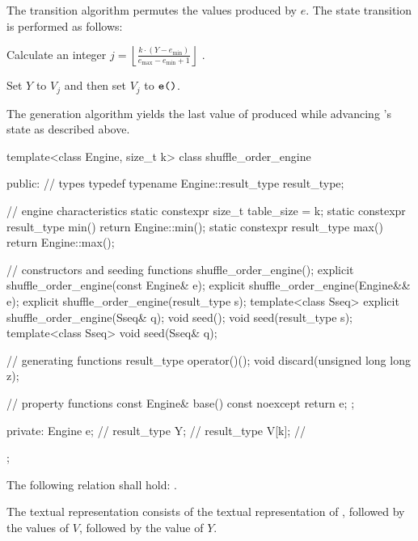 \pnum
The transition algorithm%
%
permutes the values produced by $e$.
The state transition is performed as follows:
\begin{enumeratea}
 \item
   Calculate an integer
   $j = \left\lfloor \frac{k \cdot (Y - e_{\min})}
                          {e_{\max} - e_{\min} +1}
        \right\rfloor
   $%
   .
 \item
   Set $Y$ to $V_j$ and then set $V_j$ to $\texttt{e()}$.
\end{enumeratea}

\pnum
The generation algorithm%
%
yields the last value of 
 produced while advancing 's state as described above.

\begin{codeblock}
template<class Engine, size_t k>
 class shuffle_order_engine
{
public:
 // types
 typedef typename Engine::result_type result_type;

 // engine characteristics
 static constexpr size_t table_size = k;
 static constexpr result_type min() { return Engine::min(); }
 static constexpr result_type max() { return Engine::max(); }

 // constructors and seeding functions
 shuffle_order_engine();
 explicit shuffle_order_engine(const Engine& e);
 explicit shuffle_order_engine(Engine&& e);
 explicit shuffle_order_engine(result_type s);
 template<class Sseq> explicit shuffle_order_engine(Sseq& q);
 void seed();
 void seed(result_type s);
 template<class Sseq> void seed(Sseq& q);

 // generating functions
 result_type operator()();
 void discard(unsigned long long z);

 // property functions
 const Engine& base() const noexcept { return e; };

private:
 Engine e;           // \expos
 result_type Y;      // \expos
 result_type V[k];   // \expos
};
\end{codeblock}

\pnum
The following relation shall hold:
  .

\pnum
The textual representation%
%
consists of
 the textual representation of ,
followed by
 the  values of $V$,
followed by
 the value of $Y$.

